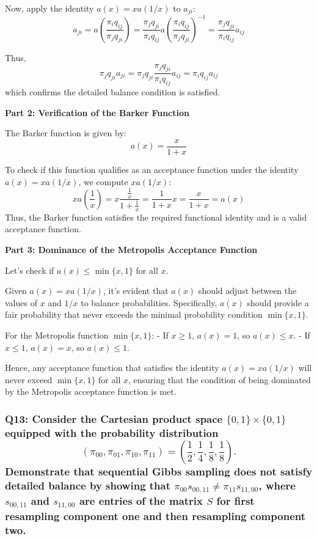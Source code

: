 \documentclass[8pt]{article}
\begin{document}
Now, apply the identity \( a(x) = x a(1/x) \) to \( a_{ji} \):
\[
a_{ji} = a \left( \frac{\pi_i q_{ij}}{\pi_j q_{ji}} \right) = \frac{\pi_j q_{ji}}{\pi_i q_{ij}} a \left( \frac{\pi_i q_{ij}}{\pi_j q_{ji}} \right)^{-1} = \frac{\pi_j q_{ji}}{\pi_i q_{ij}} a_{ij}
\]

Thus,
\[
\pi_j q_{ji} a_{ji} = \pi_j q_{ji} \frac{\pi_j q_{ji}}{\pi_i q_{ij}} a_{ij} = \pi_i q_{ij} a_{ij}
\]
which confirms the detailed balance condition is satisfied.

\textbf{Part 2: Verification of the Barker Function}

The Barker function is given by:
\[
a(x) = \frac{x}{1 + x}
\]

To check if this function qualifies as an acceptance function under the identity \( a(x) = x a(1/x) \), we compute \( x a(1/x) \):
\[
x a\left(\frac{1}{x}\right) = x \frac{\frac{1}{x}}{1 + \frac{1}{x}} = \frac{1}{1 + x} x = \frac{x}{1 + x} = a(x)
\]
Thus, the Barker function satisfies the required functional identity and is a valid acceptance function.

\textbf{Part 3: Dominance of the Metropolis Acceptance Function}

Let's check if \(a(x) \leq \min\{x, 1\}\) for all \(x\).

Given \(a(x) = x a(1/x)\), it's evident that \(a(x)\) should adjust between the values of \(x\) and \(1/x\) to balance probabilities. Specifically, \(a(x)\) should provide a fair probability that never exceeds the minimal probability condition \( \min\{x, 1\} \).

For the Metropolis function \( \min\{x, 1\} \):
- If \( x \geq 1 \), \( a(x) = 1 \), so \( a(x) \leq x \).
- If \( x \leq 1 \), \( a(x) = x \), so \( a(x) \leq 1 \).

Hence, any acceptance function that satisfies the identity \( a(x) = x a(1/x) \) will never exceed \( \min\{x, 1\} \) for all \(x\), ensuring that the condition of being dominated by the Metropolis acceptance function is met.

\subsubsection*{Q13:
Consider the Cartesian product space \(\{0, 1\} \times \{0, 1\}\) equipped with the probability distribution
\[
(\pi_{00}, \pi_{01}, \pi_{10}, \pi_{11}) = \left( \frac{1}{2}, \frac{1}{4}, \frac{1}{8}, \frac{1}{8} \right).
\]
Demonstrate that sequential Gibbs sampling does not satisfy detailed balance by showing that \(\pi_{00} s_{00, 11} \neq \pi_{11} s_{11, 00}\), where \(s_{00, 11}\) and \(s_{11, 00}\) are entries of the matrix \(S\) for first resampling component one and then resampling component two.}
\end{document}
